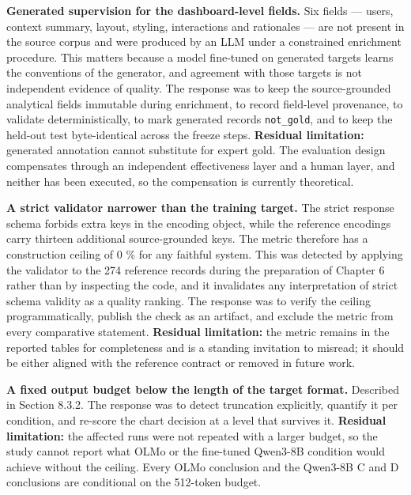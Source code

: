 \textbf{Generated supervision for the dashboard-level fields.} Six fields --- users, context summary, layout, styling, interactions and rationales --- are not present in the source corpus and were produced by an LLM under a constrained enrichment procedure. This matters because a model fine-tuned on generated targets learns the conventions of the generator, and agreement with those targets is not independent evidence of quality. The response was to keep the source-grounded analytical fields immutable during enrichment, to record field-level provenance, to validate deterministically, to mark generated records \texttt{not\_gold}, and to keep the held-out test byte-identical across the freeze steps. \textbf{Residual limitation:} generated annotation cannot substitute for expert gold. The evaluation design compensates through an independent effectiveness layer and a human layer, and neither has been executed, so the compensation is currently theoretical.

\textbf{A strict validator narrower than the training target.} The strict response schema forbids extra keys in the encoding object, while the reference encodings carry thirteen additional source-grounded keys. The metric therefore has a construction ceiling of 0 \% for any faithful system. This was detected by applying the validator to the 274 reference records during the preparation of Chapter 6 rather than by inspecting the code, and it invalidates any interpretation of strict schema validity as a quality ranking. The response was to verify the ceiling programmatically, publish the check as an artifact, and exclude the metric from every comparative statement. \textbf{Residual limitation:} the metric remains in the reported tables for completeness and is a standing invitation to misread; it should be either aligned with the reference contract or removed in future work.

\textbf{A fixed output budget below the length of the target format.} Described in Section 8.3.2. The response was to detect truncation explicitly, quantify it per condition, and re-score the chart decision at a level that survives it. \textbf{Residual limitation:} the affected runs were not repeated with a larger budget, so the study cannot report what OLMo or the fine-tuned Qwen3-8B condition would achieve without the ceiling. Every OLMo conclusion and the Qwen3-8B C and D conclusions are conditional on the 512-token budget.

